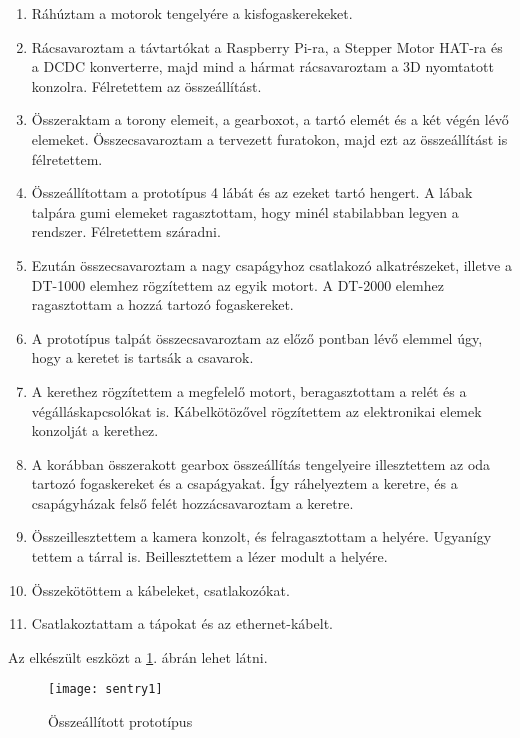 \begin{enumerate}
	\item Ráhúztam a motorok tengelyére a kisfogaskerekeket. 
	\item Rácsavaroztam a távtartókat a Raspberry Pi-ra, a Stepper Motor HAT-ra és a DCDC konverterre, majd mind a hármat rácsavaroztam a 3D nyomtatott konzolra. Félretettem az összeállítást.
	\item Összeraktam a torony elemeit, a gearboxot, a tartó elemét és a két végén lévő elemeket. Összecsavaroztam a tervezett furatokon, majd ezt az összeállítást is félretettem. 
	\item Összeállítottam a prototípus 4 lábát és az ezeket tartó hengert. A lábak talpára gumi elemeket ragasztottam, hogy minél stabilabban legyen a rendszer. Félretettem száradni.
	\item Ezután összecsavaroztam a nagy csapágyhoz csatlakozó alkatrészeket, illetve a DT-1000 elemhez rögzítettem az egyik motort. A DT-2000 elemhez ragasztottam a hozzá tartozó fogaskereket.
	\item A prototípus talpát összecsavaroztam az előző pontban lévő elemmel úgy, hogy a keretet is tartsák a csavarok.
	\item A kerethez rögzítettem a megfelelő motort, beragasztottam a relét és a végálláskapcsolókat is. Kábelkötözővel rögzítettem az elektronikai elemek konzolját a kerethez.
	\item A korábban összerakott gearbox összeállítás tengelyeire illesztettem az oda tartozó fogaskereket és a csapágyakat. Így ráhelyeztem a keretre, és a csapágyházak felső felét hozzácsavaroztam a keretre. 
	\item Összeillesztettem a kamera konzolt, és felragasztottam a helyére. Ugyanígy tettem a tárral is. Beillesztettem a lézer modult a helyére.
	\item Összekötöttem a kábeleket, csatlakozókat.
	\item Csatlakoztattam a tápokat és az ethernet-kábelt.
\end{enumerate}
Az elkészült eszközt a \ref{fig:sentry1}. ábrán lehet látni.
\pagebreak

\begin{figure}[h!]
	\centering
	\texttt{[image: sentry1]}
	\caption{Összeállított prototípus}
	\label{fig:sentry1}
\end{figure}
